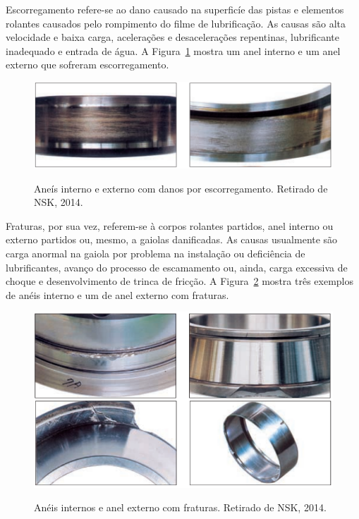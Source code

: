 \documentclass[
	12pt,				
	oneside,			
	a4paper,			
	english,			
	brazil,			
	]{abntex2ppgsi}
\begin{document}
Escorregamento refere-se ao dano causado na superficíe das pistas e elementos rolantes causados pelo rompimento do filme de lubrificação. As causas são alta velocidade e baixa carga, acelerações e desacelerações repentinas, lubrificante inadequado e entrada de água. A Figura~\ref{escorregamento_nsk} mostra um anel interno e um anel externo que sofreram escorregamento. 

\begin{figure}[H]
\centering
\caption {Aneís interno e externo com danos por escorregamento. Retirado de NSK, 2014.}
\includegraphics[width=\textwidth,height=\textheight,keepaspectratio]{escorregamento_nsk}
\label{escorregamento_nsk}
\end{figure}

Fraturas, por sua vez, referem-se à corpos rolantes partidos, anel interno ou externo partidos ou, mesmo, a gaiolas danificadas. As causas usualmente são carga anormal na gaiola por problema na instalação ou deficiência de lubrificantes, avanço do processo de escamamento ou, ainda, carga excessiva de choque e desenvolvimento de trinca de fricção. A Figura~\ref{fraturas_nsk} mostra três exemplos de anéis interno e um de anel externo com fraturas. 

\begin{figure}[H]
\centering
\caption {Anéis internos e anel externo com fraturas. Retirado de NSK, 2014.}
\includegraphics[width=\textwidth,height=\textheight,keepaspectratio]{fraturas_nsk}
\label{fraturas_nsk}
\end{figure}
\end{document}
